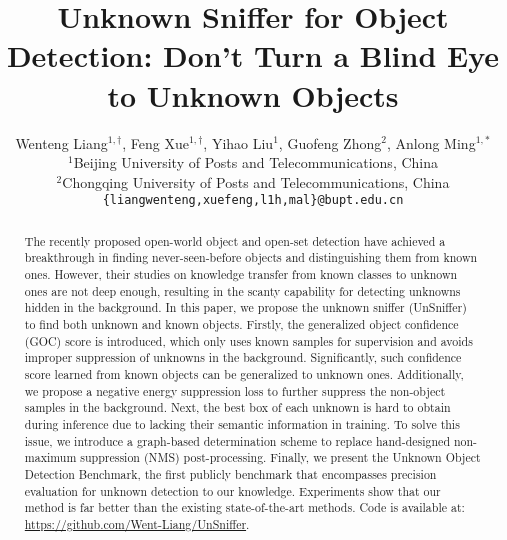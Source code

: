 \documentclass[10pt,twocolumn,letterpaper]{article}
\newcommand{\xf}[1]{{\color{black} #1}}
\begin{document}
\title{Unknown Sniffer for Object Detection: Don't Turn a Blind Eye\\ to Unknown Objects}

\author{Wenteng Liang$^{1,\dag}$, Feng Xue$^{1,\dag}$, Yihao Liu$^1$, Guofeng Zhong$^2$, Anlong Ming$^{1,*}$\\
$^1$Beijing University of Posts and Telecommunications, China\\
$^2$Chongqing University of Posts and Telecommunications, China\\
{\tt\small \{liangwenteng,xuefeng,l1h,mal\}@bupt.edu.cn}}

\maketitle

\renewcommand{\thefootnote}{\fnsymbol{footnote}}


\begin{abstract}
The recently proposed open-world object and open-set detection \xf{have achieved} a breakthrough in finding never-seen-before objects and distinguishing them from \xf{known ones}.
However, their studies on knowledge transfer from known classes to unknown ones \xf{are not deep enough},
\xf{resulting in} the scanty capability for detecting unknowns hidden in the background.
In this paper, we propose the unknown sniffer (UnSniffer) to find both unknown and known objects.
Firstly, the generalized object confidence (GOC) score is introduced,
which only uses \xf{known} samples for supervision and avoids improper suppression of unknowns in the background.
Significantly, such confidence score learned from \xf{known} objects can be generalized to unknown ones.
Additionally, we propose a negative energy suppression loss to further \xf{suppress} the non-object samples in the background.
Next, the best box of each unknown is hard to obtain during inference due to lacking their semantic information in training.
To solve this issue,
we introduce a graph-based determination scheme to replace hand-designed non-maximum suppression (NMS) post-processing.
Finally, we present the Unknown Object Detection Benchmark,
the first publicly benchmark that encompasses precision evaluation for \xf{unknown detection} to our knowledge.
Experiments show that our method is far better than the existing state-of-the-art methods.
Code is available at: \url{https://github.com/Went-Liang/UnSniffer}.


\end{abstract}
\end{document}
